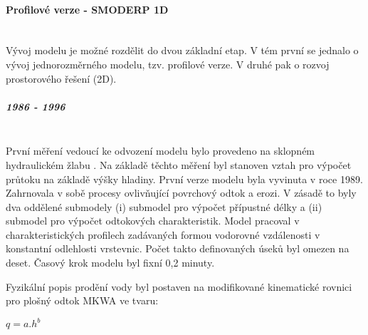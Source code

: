 \paragraph{Profilové verze - SMODERP 1D}  \mbox{} \\
Vývoj modelu je možné rozdělit do dvou základní etap. V tém první se jednalo o vývoj jednorozměrného modelu, tzv. profilové verze. V druhé pak o rozvoj prostorového řešení (2D).
\subparagraph{1986 - 1996}  \mbox{} \\
První měření vedoucí ke odvození modelu bylo provedeno na sklopném hydraulickém žlabu \citep{Holy1984}. Na základě těchto měření byl stanoven vztah pro výpočet průtoku na základě výšky hladiny. První verze modelu byla vyvinuta v roce 1989. Zahrnovala v sobě procesy ovlivňující povrchový odtok a erozi. V zásadě to byly dva oddělené submodely  (i) submodel pro výpočet přípustné délky  a (ii) submodel pro výpočet odtokových charakteristik. Model pracoval v charakteristických profilech zadávaných formou vodorovné vzdálenosti v konstantní odlehlosti vrstevnic. Počet takto definovaných úseků byl omezen na deset. Časový krok modelu byl fixní 0,2 minuty.

Fyzikální popis prodění vody byl postaven na modifikované kinematické rovnici pro plošný odtok \acs{MKWA} ve tvaru:

$q = a.h^b$

